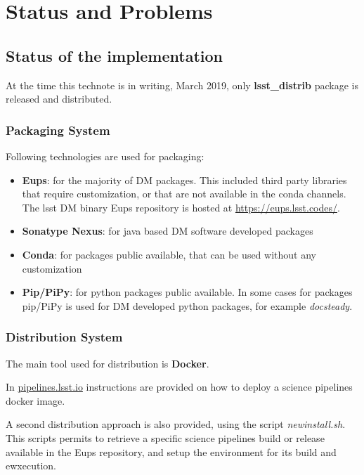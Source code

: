 \section{Status and Problems} \label{sec:statusAndProblems}

\subsection{Status of the implementation} \label{sec:status}

At the time this technote is in writing, March 2019, only \textbf{lsst\_distrib} package is released and distributed.


\subsubsection{Packaging System} \label{sec:statusPkgs}

Following technologies are used for packaging:

\begin{itemize}
\item {\bf Eups}: for the majority of DM packages. This included third party libraries that require customization, or that are not available in the conda channels. The lsst DM binary Eups repository is hosted at \url{https://eups.lsst.codes/}. 
\item {\bf Sonatype Nexus}: for java based DM software developed packages
\item {\bf Conda}: for packages public available, that can be used without any customization
\item {\bf Pip/PiPy}: for python packages public available. In some cases for packages pip/PiPy is used for DM developed python packages, for example \textit{docsteady}.
\end{itemize}


\subsubsection{Distribution System} \label{sec:statusDistrib}

The main tool used for distribution is \textbf{Docker}. 

In \url{pipelines.lsst.io} instructions are provided on how to deploy a science pipelines docker image.

A second distribution approach is also provided, using the script \textit{newinstall.sh}. 
This scripts permits to retrieve a specific science pipelines build or release available in the Eups repository, and setup the environment for its build and ewxecution.


